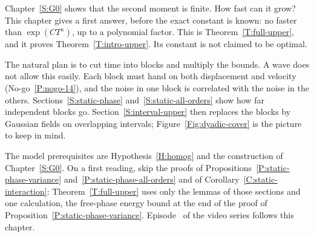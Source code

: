 Chapter~\ref{S:G0} shows that the second moment is finite. How fast can
it grow? This chapter gives a first answer, before the exact constant is
known: no faster than $\exp(CT^\kappa)$, up to a polynomial factor. This is
Theorem~\ref{T:full-upper}, and it proves Theorem~\ref{T:intro-upper}. Its
constant is not claimed to be optimal.

The natural plan is to cut time into blocks and multiply the bounds. A wave
does not allow this easily. Each block must hand on both displacement
and velocity (No-go~\ref{P:nogo-14}), and the noise in one block is
correlated with the noise in the others. Sections~\ref{S:static-phase}
and~\ref{S:static-all-orders} show how far independent blocks
go. Section~\ref{S:interval-upper} then replaces the blocks by Gaussian fields
on overlapping intervals; Figure~\ref{Fig:dyadic-cover} is the picture to
keep in mind.

The model prerequisites are Hypothesis~\ref{H:homog} and the
construction of Chapter~\ref{S:G0}. On a first reading, skip the proofs of
Propositions~\ref{P:static-phase-variance} and~\ref{P:static-phase-all-orders}
and of Corollary~\ref{C:static-interaction}: Theorem~\ref{T:full-upper}
uses only the lemmas of those sections and one calculation, the free-phase
energy bound at the end of the proof of
Proposition~\ref{P:static-phase-variance}.
Episode~ of the video series follows this chapter.
